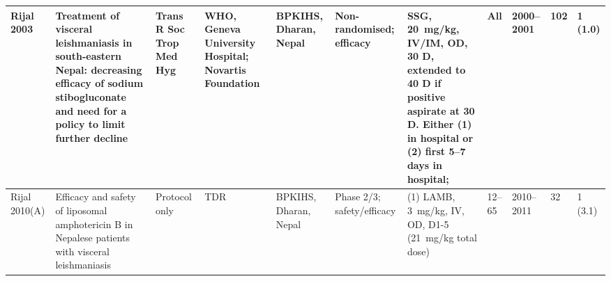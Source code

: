 \begin{ThreePartTable}
\begin{longtable}[c]{L{1.5cm} L{3.5cm} L{1.3cm} L{2.5cm} L{2.5cm} L{2.5cm} L{3cm} L{1.5cm} L{1cm} L{1cm} L{1.3cm}}
    Rijal 2003\cite{rijal2003}                      & Treatment of visceral leishmaniasis in south-eastern Nepal: decreasing efficacy of sodium stibogluconate and need for a policy to limit further decline                                                                     & Trans R Soc Trop Med Hyg & WHO, Geneva University Hospital; Novartis Foundation                                 & BPKIHS, Dharan, Nepal                             & Non-randomised; efficacy                                                           & SSG, 20~mg/kg, IV/IM, OD, 30 D, extended to 40 D if positive aspirate at 30 D. Either (1) in hospital or (2) first 5--7 days in hospital;                                                                    & All         & 2000--2001   & 102          & 1 (1.0)                                                                                                                                                                                                                                                                                                                                                                                                                                                                                                                                                                                        \\ \midrule
    Rijal 2010(A)\cite{rijal2010a}                  & Efficacy and safety of liposomal amphotericin B in Nepalese patients with visceral leishmaniasis                                                                                                                            & Protocol only            & TDR                                                                                  & BPKIHS, Dharan, Nepal                             & Phase 2/3; safety/efficacy                                                         & (1) LAMB, 3~mg/kg, IV, OD, D1-5 (21~mg/kg total dose)                                                                                                                                                                 & 12--65      & 2010--2011   & 32           & 1 (3.1)                                                                                                                                                                                                                                                                                                                                                                                                                                                                                                                                                                                        \\ \midrule

\end{longtable}
\end{ThreePartTable}
